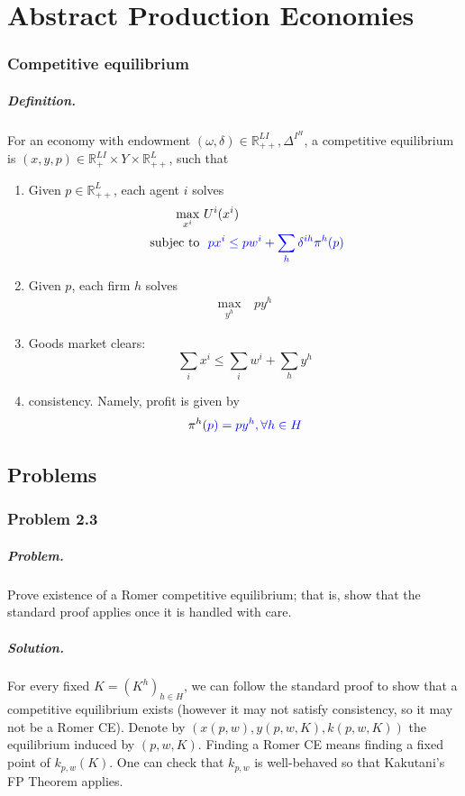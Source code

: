 \chapter{Abstract Production Economies}
\subsection{Competitive equilibrium}
\paragraph{Definition.}
For an economy with endowment $(\omega, \delta) \in \mathbb{R}_{++}^{LI}, \Delta^{I^H}$, 
a competitive equilibrium is $(x, y, p) \in \mathbb{R}_{+}^{LI} \times Y \times \mathbb{R}_{++}^{L}$,
such that 
\begin{enumerate}
    \item Given $p \in \mathbb{R}^L_{++}$, each agent $i$ solves 
    \begin{align*}
        \max_{x^i} \ & U^i(x^i) \\ 
        \text{ subjec to } & \ \color{blue}{p} x^i \leq \color{blue}{p}  w^i + \sum_h \delta^{ih} \pi^h(\color{blue}{p} )
    \end{align*}
    \item Given $p$, each firm $h$ solves 
    \begin{align*}
        \max_{y^h} \ & p y^h
    \end{align*}
    \item Goods market clears: 
    \[
        \sum_i x^i  \leq \sum_i w^i + \sum_h y^h
    \]
    \item consistency. Namely, profit is given by
    \[
    \pi^h(\color{blue}{p}) = p y^h, \forall h \in H
    \]
\end{enumerate}

\section{Problems}
\subsection{Problem 2.3}
\paragraph{Problem.} Prove existence of a Romer competitive equilibrium; that is, show that the standard proof applies once it is handled with care.

\paragraph{Solution.}
For every fixed $K = (K^h)_{h \in H}$, we can follow the standard proof to show that a competitive equilibrium exists (however it may not satisfy consistency, so it may not be a Romer CE). Denote by $(x(p, w), y(p, w, K), k(p, w, K))$ the equilibrium induced by $(p, w, K)$. Finding a Romer CE means finding a fixed point of $k_{p,w}(K)$. One can check that $k_{p,w}$ is well-behaved so that Kakutani's FP Theorem applies.


